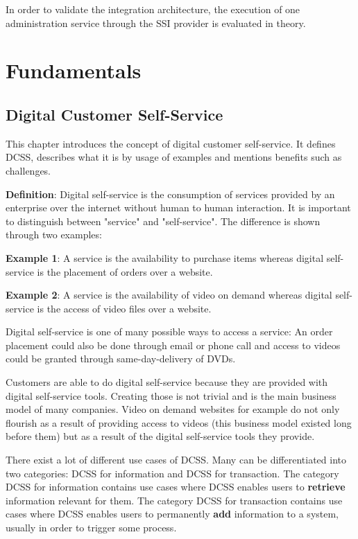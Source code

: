 \documentclass[
     12pt,         %
     a4paper,      %
     BCOR=10mm,version=first,     %
     DIV=14,version=first,        %
     ]{scrreprt}
\begin{document}
In order to validate the integration architecture, the execution of one administration service through the SSI provider is evaluated in theory.

\chapter{Fundamentals}

\section{Digital Customer Self-Service}
This chapter introduces the concept of digital customer self-service. It defines DCSS, describes what it is by usage of examples and mentions benefits such as challenges.

\textbf{Definition}: Digital self-service is the consumption of services provided by an enterprise over the internet without human to human interaction.
It is important to distinguish between "service" and "self-service".
The difference is shown through two examples:

\textbf{Example 1}: A service is the availability to purchase items whereas digital self-service is the placement of orders over a website.

\textbf{Example 2}: A service is the availability of video on demand whereas digital self-service is the access of video files over a website.

Digital self-service is one of many possible ways to access a service: An order placement could also be done through email or phone call and access to videos could be granted through same-day-delivery of DVDs.

Customers are able to do digital self-service because they are provided with digital self-service tools. Creating those is not trivial and is the main business model of many companies. Video on demand websites for example do not only flourish as a result of providing access to videos (this business model existed long before them) but as a result of the digital self-service tools they provide.

There exist a lot of different use cases of DCSS. Many can be differentiated into two categories: DCSS for information and DCSS for transaction.
The category DCSS for information contains use cases where DCSS enables users to \textbf{retrieve} information relevant for them. The category DCSS for transaction contains use cases where DCSS enables users to permanently \textbf{add} information to a system, usually in order to trigger some process.
\end{document}
